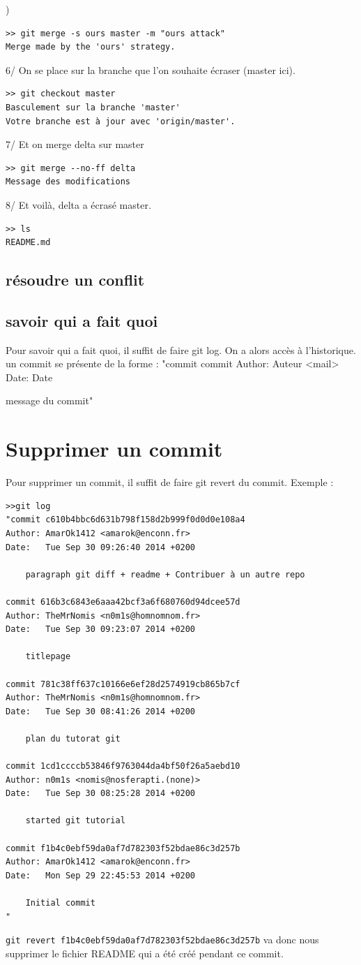 \documentclass[a4paper,10pt]{report}
\begin{document}
)
\begin{verbatim}
>> git merge -s ours master -m "ours attack"
Merge made by the 'ours' strategy.
\end{verbatim}
    6/ On se place sur la branche que l'on souhaite écraser (master ici). 
\begin{verbatim}
>> git checkout master
Basculement sur la branche 'master'
Votre branche est à jour avec 'origin/master'.
\end{verbatim}
    7/ Et on merge delta sur master
\begin{verbatim}
>> git merge --no-ff delta 
Message des modifications
\end{verbatim}
    8/ Et voilà, delta a écrasé master.
\begin{verbatim}
>> ls
README.md
\end{verbatim}


     \subsection{résoudre un conflit}
     \subsection{savoir qui a fait quoi}
     Pour savoir qui a fait quoi, il suffit de faire git log. On a alors accès à l'historique. un commit se présente de la forme : 
     "commit \no commit
Author: Auteur <mail>
Date:   Date

    message du commit"
  \section{Supprimer un commit}
  Pour supprimer un commit, il suffit de faire git revert \no du commit.
Exemple :
\begin{verbatim}
>>git log
"commit c610b4bbc6d631b798f158d2b999f0d0d0e108a4
Author: AmarOk1412 <amarok@enconn.fr>
Date:   Tue Sep 30 09:26:40 2014 +0200

    paragraph git diff + readme + Contribuer à un autre repo

commit 616b3c6843e6aaa42bcf3a6f680760d94dcee57d
Author: TheMrNomis <n0m1s@homnomnom.fr>
Date:   Tue Sep 30 09:23:07 2014 +0200

    titlepage

commit 781c38ff637c10166e6ef28d2574919cb865b7cf
Author: TheMrNomis <n0m1s@homnomnom.fr>
Date:   Tue Sep 30 08:41:26 2014 +0200

    plan du tutorat git

commit 1cd1ccccb53846f9763044da4bf50f26a5aebd10
Author: n0m1s <nomis@nosferapti.(none)>
Date:   Tue Sep 30 08:25:28 2014 +0200

    started git tutorial

commit f1b4c0ebf59da0af7d782303f52bdae86c3d257b
Author: AmarOk1412 <amarok@enconn.fr>
Date:   Mon Sep 29 22:45:53 2014 +0200

    Initial commit
"
\end{verbatim}
\verb|git revert f1b4c0ebf59da0af7d782303f52bdae86c3d257b| va donc nous supprimer le fichier README qui a été créé pendant ce commit.
\end{document}
